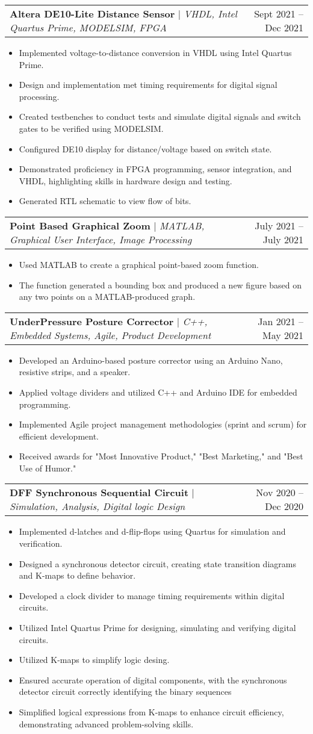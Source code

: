 \documentclass[A4,10pt]{article}
\makeatletter
\newcommand{\resumeItem}[1]{
  \item\small{
    {#1 \vspace{-2pt}}
  }
}
\newcommand{\resumeProjectHeading}[2]{
    \item
    \begin{tabular*}{0.97\textwidth}{l@{\extracolsep{\fill}}r}
      \small#1 & #2 \\
    \end{tabular*}\vspace{-7pt}
}
\newcommand{\resumeItemListStart}{\begin{itemize}}
\newcommand{\resumeItemListEnd}{\end{itemize}\vspace{-5pt}}
\makeatother
\begin{document}
        \resumeProjectHeading
        {\textbf{Altera DE10-Lite Distance Sensor} $|$ \emph{VHDL, Intel Quartus Prime, MODELSIM, FPGA}}{Sept 2021 -- Dec 2021}
        \resumeItemListStart
          \resumeItem{Implemented voltage-to-distance conversion in VHDL using Intel Quartus Prime.}
          \resumeItem{Design and implementation met timing requirements for digital signal processing.}
          \resumeItem{Created testbenches to conduct tests and simulate digital signals and switch gates to be verified using MODELSIM.}
          \resumeItem{Configured DE10 display for distance/voltage based on switch state.}
          \resumeItem{Demonstrated proficiency in FPGA programming, sensor integration, and VHDL, highlighting skills in hardware design and testing.}
          \resumeItem{Generated RTL schematic to view flow of bits.}
        \resumeItemListEnd
        
        \resumeProjectHeading
        {\textbf{Point Based Graphical Zoom} $|$ \emph{MATLAB, Graphical User Interface, Image Processing}}{July 2021 -- July 2021}
        \resumeItemListStart
          \resumeItem{Used MATLAB to create a graphical point-based zoom function.}
          \resumeItem{The function generated a bounding box and produced a new figure based on any two points on a MATLAB-produced graph.}
        \resumeItemListEnd

        \resumeProjectHeading
        {\textbf{UnderPressure Posture Corrector} $|$ \emph{C++, Embedded Systems, Agile, Product Development}}{Jan 2021 -- May 2021}
        \resumeItemListStart
          \resumeItem{Developed an Arduino-based posture corrector using an Arduino Nano, resistive strips, and a speaker.}
          \resumeItem{Applied voltage dividers and utilized C++ and Arduino IDE for embedded programming.}
          \resumeItem{Implemented Agile project management methodologies (sprint and scrum) for efficient development.}
          \resumeItem{Received awards for "Most Innovative Product," "Best Marketing," and "Best Use of Humor."}
        \resumeItemListEnd

        
        \resumeProjectHeading
        {\textbf{DFF Synchronous Sequential Circuit} $|$ \emph{Simulation, Analysis, Digital logic Design}}{Nov 2020 -- Dec 2020}
        \resumeItemListStart
          \resumeItem{Implemented d-latches and d-flip-flops using Quartus for simulation and verification.}
          \resumeItem{Designed a synchronous detector circuit, creating state transition diagrams and K-maps to define behavior.}
          \resumeItem{Developed a clock divider to manage timing requirements within digital circuits.}
          \resumeItem{Utilized Intel Quartus Prime for designing, simulating and verifying digital circuits.}
          \resumeItem{Utilized K-maps to simplify logic desing.}
          \resumeItem{Ensured accurate operation of digital components, with the synchronous detector circuit correctly identifying the binary sequences}
          \resumeItem{Simplified logical expressions from K-maps to enhance circuit efficiency, demonstrating advanced problem-solving skills.}
        \resumeItemListEnd
\end{document}
